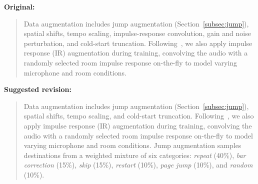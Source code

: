 \documentclass{article}
\begin{document}
\textbf{Original:}
\begin{quote}
Data augmentation includes jump augmentation (Section~\ref{subsec:jump}), spatial shifts, tempo scaling, impulse-response convolution, gain and noise perturbation, and cold-start truncation. Following~\cite{henkel2021real}, we also apply impulse response (IR) augmentation during training, convolving the audio with a randomly selected room impulse response on-the-fly to model varying microphone and room conditions.
\end{quote}

\textbf{Suggested revision:}
\begin{quote}
Data augmentation includes jump augmentation (Section~\ref{subsec:jump}), spatial shifts, tempo scaling, and cold-start truncation. Following~\cite{henkel2021real}, we also apply impulse response (IR) augmentation during training, convolving the audio with a randomly selected room impulse response on-the-fly to model varying microphone and room conditions. Jump augmentation samples destinations from a weighted mixture of six categories: \emph{repeat} (40\%), \emph{bar correction} (15\%), \emph{skip} (15\%), \emph{restart} (10\%), \emph{page jump} (10\%), and \emph{random} (10\%).
\end{quote}
\end{document}
